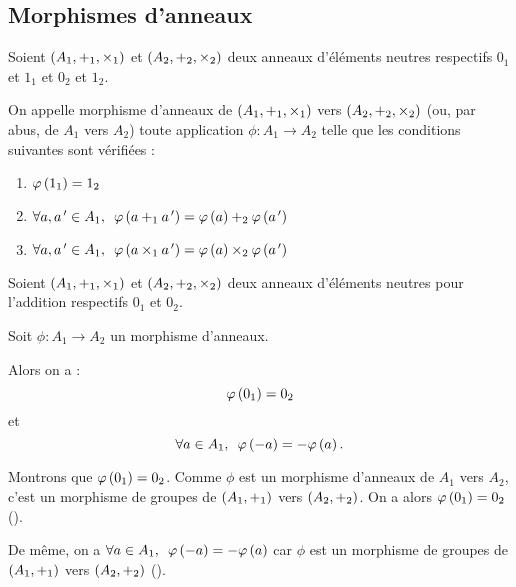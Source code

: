 \subsection{Morphismes d'anneaux}

\begin{defi}
Soient \(\anneau{A_1}[+_1][\times_1]\) et \(\anneau{A_2}[+_2][\times_2]\) deux anneaux d'éléments neutres respectifs \(0_1\) et \(1_1\) et \(0_2\) et \(1_2\).

On appelle morphisme d'anneaux de \(\anneau{A_1}[+_1][\times_1]\) vers \(\anneau{A_2}[+_2][\times_2]\) (ou, par abus, de \(A_1\) vers \(A_2\)) toute application \(\phi:A_1\to A_2\) telle que les conditions suivantes sont vérifiées :

\begin{enumerate}
\item \(\varphi\left(1_1\right)=1_2\) \\

\item \(\quantifs{\forall a,a\prim\in A_1}\phi\paren{a+_1a\prim}=\phi\paren{a}+_2\phi\paren{a\prim}\) \\

\item \(\quantifs{\forall a,a\prim\in A_1}\phi\paren{a\times_1a\prim}=\phi\paren{a}\times_2\phi\paren{a\prim}\) \\
\end{enumerate}
\end{defi}

\begin{prop}
Soient \(\anneau{A_1}[+_1][\times_1]\) et \(\anneau{A_2}[+_2][\times_2]\) deux anneaux d'éléments neutres pour l'addition respectifs \(0_1\) et \(0_2\).

Soit \(\phi:A_1\to A_2\) un morphisme d'anneaux.

Alors on a : \[\varphi\left(0_1\right)=0_2\] et \[\quantifs{\forall a\in A_1}\phi\paren{-a}=-\phi\paren{a}.\]
\end{prop}

\begin{dem}
Montrons que \(\varphi\left(0_1\right)=0_2\). Comme \(\phi\) est un morphisme d'anneaux de \(A_1\) vers \(A_2\), c'est un morphisme de groupes de \(\groupe{A_1}[+_1]\) vers \(\groupe{A_2}[+_2]\). On a alors \(\varphi\left(0_1\right)=0_2\) (\cf {}).

De même, on a \(\quantifs{\forall a\in A_1}\phi\paren{-a}=-\phi\paren{a}\) car \(\phi\) est un morphisme de groupes de \(\groupe{A_1}[+_1]\) vers \(\groupe{A_2}[+_2]\) (\cf {}).
\end{dem}


